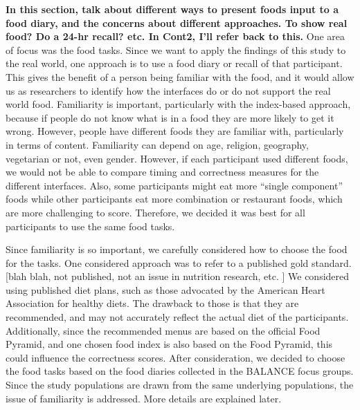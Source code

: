 \textbf{In this section, talk about different ways to present foods input to a food diary, and the concerns about different approaches. To show real food? Do a 24-hr recall? etc. In Cont2, I'll refer back to this. }
One area of focus was the food tasks. Since we want to apply the findings of this study to the real world, one approach is to use a food diary or recall of that participant. This gives the benefit of a person being familiar with the food, and it would allow us as researchers to identify how the interfaces do or do not support the real world food. Familiarity is important, particularly with the index-based approach, because if people do not know what is in a food they are more likely to get it wrong. However, people have different foods they are familiar with, particularly in terms of content. Familiarity can depend on age, religion, geography, vegetarian or not, even gender. However, if each participant used different foods, we would not be able to compare timing and correctness measures for the different interfaces. Also, some participants might eat more ``single component'' foods while other participants eat more combination or restaurant foods, which are more challenging to score. Therefore, we decided it was best for all participants to use the same food tasks. 

Since familiarity is so important, we carefully considered how to choose the food for the tasks. One considered approach was to refer to a published gold standard. [blah blah, not published, not an issue in nutrition research, etc. ] We considered using published diet plans, such as those advocated by the American Heart Association for healthy diets. The drawback to those is that they are recommended, and may not accurately reflect the actual diet of the participants. Additionally, since the recommended menus are based on the official Food Pyramid, and one chosen food index is also based on the Food Pyramid, this could influence the correctness scores. After consideration, we decided to choose the food tasks based on the food diaries collected in the BALANCE focus groups. Since the study populations are drawn from the same underlying populations, the issue of familiarity is addressed. More details are explained later. 

